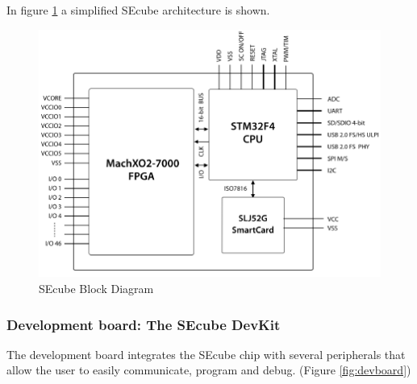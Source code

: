 In figure \ref{fig:SEcubeBD} a simplified SEcube architecture is shown.

\begin{figure}[ht]
	\centering
	\includegraphics[width=\textwidth]{chapters/figures/development/SEcubeBlocks.png}
	\caption{SEcube Block Diagram}
	\label{fig:SEcubeBD}
\end{figure}


\subsubsection{Development board: The SEcube DevKit}

The development board integrates the SEcube chip with several peripherals that allow the user to easily communicate, program and debug. (Figure \ref{fig:devboard})

